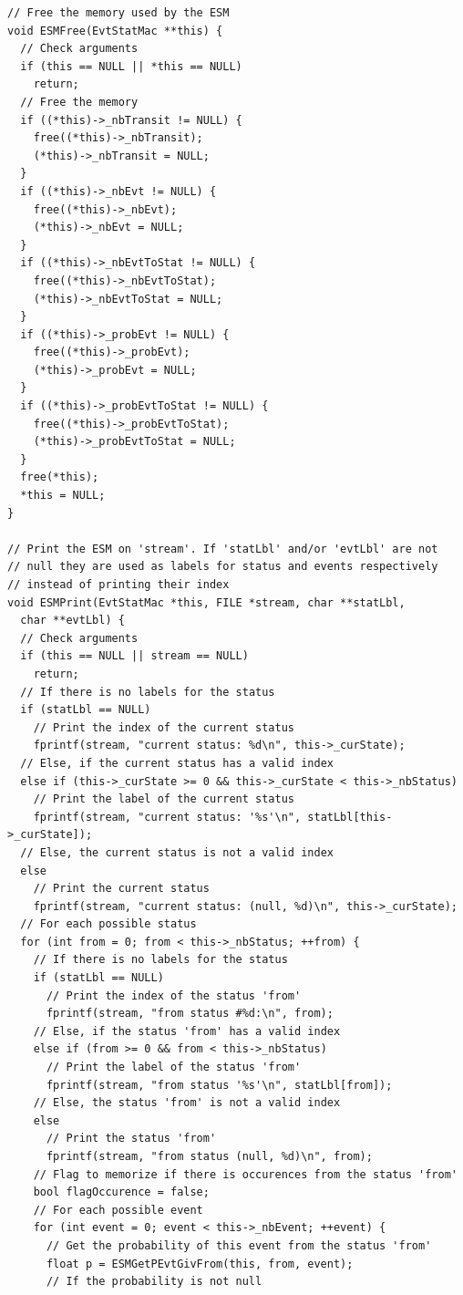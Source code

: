 \documentclass[12pt, a4paper]{article}
\begin{document}
\begin{scriptsize}
\begin{ttfamily}
\begin{lstlisting}
// Free the memory used by the ESM
void ESMFree(EvtStatMac **this) {
  // Check arguments
  if (this == NULL || *this == NULL) 
    return;
  // Free the memory
  if ((*this)->_nbTransit != NULL) {
    free((*this)->_nbTransit);
    (*this)->_nbTransit = NULL;
  }
  if ((*this)->_nbEvt != NULL) {
    free((*this)->_nbEvt);
    (*this)->_nbEvt = NULL;
  }
  if ((*this)->_nbEvtToStat != NULL) {
    free((*this)->_nbEvtToStat);
    (*this)->_nbEvtToStat = NULL;
  }
  if ((*this)->_probEvt != NULL) {
    free((*this)->_probEvt);
    (*this)->_probEvt = NULL;
  }
  if ((*this)->_probEvtToStat != NULL) {
    free((*this)->_probEvtToStat);
    (*this)->_probEvtToStat = NULL;
  }
  free(*this);
  *this = NULL;
}

// Print the ESM on 'stream'. If 'statLbl' and/or 'evtLbl' are not 
// null they are used as labels for status and events respectively 
// instead of printing their index
void ESMPrint(EvtStatMac *this, FILE *stream, char **statLbl, 
  char **evtLbl) {
  // Check arguments
  if (this == NULL || stream == NULL) 
    return;
  // If there is no labels for the status
  if (statLbl == NULL)
    // Print the index of the current status
    fprintf(stream, "current status: %d\n", this->_curState);
  // Else, if the current status has a valid index
  else if (this->_curState >= 0 && this->_curState < this->_nbStatus)
    // Print the label of the current status
    fprintf(stream, "current status: '%s'\n", statLbl[this->_curState]);
  // Else, the current status is not a valid index
  else 
    // Print the current status
    fprintf(stream, "current status: (null, %d)\n", this->_curState);
  // For each possible status
  for (int from = 0; from < this->_nbStatus; ++from) {
    // If there is no labels for the status
    if (statLbl == NULL)
      // Print the index of the status 'from'
      fprintf(stream, "from status #%d:\n", from);
    // Else, if the status 'from' has a valid index
    else if (from >= 0 && from < this->_nbStatus)
      // Print the label of the status 'from'
      fprintf(stream, "from status '%s'\n", statLbl[from]);
    // Else, the status 'from' is not a valid index
    else 
      // Print the status 'from'
      fprintf(stream, "from status (null, %d)\n", from);
    // Flag to memorize if there is occurences from the status 'from'
    bool flagOccurence = false;
    // For each possible event
    for (int event = 0; event < this->_nbEvent; ++event) {
      // Get the probability of this event from the status 'from'
      float p = ESMGetPEvtGivFrom(this, from, event);
      // If the probability is not null

\end{lstlisting}
\end{ttfamily}
\end{scriptsize}
\end{document}
